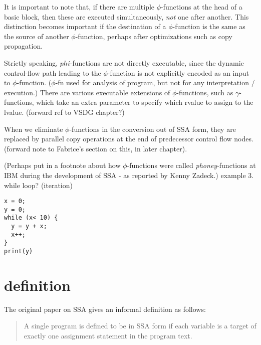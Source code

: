 It is important to note that, if there are multiple $\phi$-functions
at the head of a basic block, then these are executed simultaneously,
\textit{not} one after another.
This distinction becomes important if the destination of a $\phi$-function
is the same as the source of another $\phi$-function, perhaps after
optimizations such as copy propagation.

Strictly speaking, $phi$-functions are not directly executable,
since the dynamic control-flow path leading to the $\phi$-function
is not explicitly encoded as an input to $\phi$-function.
($\phi$-fn used for analysis of program, but not for any
interpretation / execution.)
There are various executable extensions of $\phi$-functions, 
such as $\gamma$-functions, which take
an extra parameter to specify which rvalue to assign to the lvalue.
(forward ref to VSDG chapter?)

When we eliminate $\phi$-functions in the conversion out of SSA form,
they are replaced by parallel copy operations at the end of predecessor
control flow nodes. (forward note to Fabrice's section on this,
in later chapter).

(Perhaps put in a footnote about how $\phi$-functions were
called \textit{phoney}-functions at IBM during the development
of SSA - as reported by Kenny Zadeck.)
example 3. while loop? (iteration)

\begin{verbatim}
x = 0;
y = 0;
while (x< 10) {
  y = y + x;
  x++;
}
print(y)
\end{verbatim}




\section{definition}


The original paper on SSA gives an informal
definition as follows:

\begin{quotation}
A single program is defined to be in SSA
form if each variable is a target of
exactly one assignment statement in the
program text.
\end{quotation}



